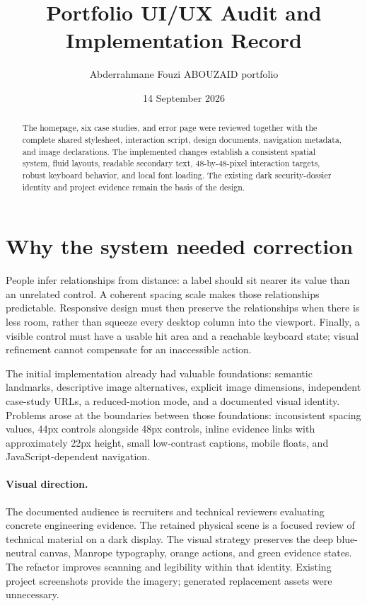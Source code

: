 \documentclass[11pt,a4paper]{article}
\title{Portfolio UI/UX Audit and Implementation Record}
\author{Abderrahmane Fouzi ABOUZAID portfolio}
\date{14 September 2026}
\begin{document}
\maketitle

\begin{abstract}
The homepage, six case studies, and error page were reviewed together with the complete shared stylesheet, interaction script, design documents, navigation metadata, and image declarations. The implemented changes establish a consistent spatial system, fluid layouts, readable secondary text, 48-by-48-pixel interaction targets, robust keyboard behavior, and local font loading. The existing dark security-dossier identity and project evidence remain the basis of the design.
\end{abstract}

\section{Why the system needed correction}
People infer relationships from distance: a label should sit nearer its value than an unrelated control. A coherent spacing scale makes those relationships predictable. Responsive design must then preserve the relationships when there is less room, rather than squeeze every desktop column into the viewport. Finally, a visible control must have a usable hit area and a reachable keyboard state; visual refinement cannot compensate for an inaccessible action.

The initial implementation already had valuable foundations: semantic landmarks, descriptive image alternatives, explicit image dimensions, independent case-study URLs, a reduced-motion mode, and a documented visual identity. Problems arose at the boundaries between those foundations: inconsistent spacing values, 44px controls alongside 48px controls, inline evidence links with approximately 22px height, small low-contrast captions, mobile floats, and JavaScript-dependent navigation.

\paragraph{Visual direction.}
The documented audience is recruiters and technical reviewers evaluating concrete engineering evidence. The retained physical scene is a focused review of technical material on a dark display. The visual strategy preserves the deep blue-neutral canvas, Manrope typography, orange actions, and green evidence states. The refactor improves scanning and legibility within that identity. Existing project screenshots provide the imagery; generated replacement assets were unnecessary.
\end{document}
